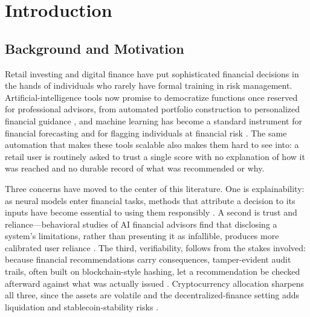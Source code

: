 \section{Introduction}\label{sec:intro}

\subsection{Background and Motivation}\label{subsec:background}
Retail investing and digital finance have put sophisticated financial decisions in
the hands of individuals who rarely have formal training in risk management.
Artificial-intelligence tools now promise to democratize functions once reserved for
professional advisors, from automated portfolio construction to personalized
financial guidance \cite{ref1,ref2,ref8}, and machine learning has become a standard
instrument for financial forecasting and for flagging individuals at financial risk
\cite{ref3,ref7,ref18}. The same automation that makes these tools scalable also
makes them hard to see into: a retail user is routinely asked to trust a single score
with no explanation of how it was reached and no durable record of what was
recommended or why.

Three concerns have moved to the center of this literature. One is explainability: as
neural models enter financial tasks, methods that attribute a decision to its inputs
have become essential to using them responsibly \cite{ref10,ref12,ref21}. A second is
trust and reliance---behavioral studies of AI financial advisors find that disclosing
a system's limitations, rather than presenting it as infallible, produces more
calibrated user reliance \cite{ref11}. The third, verifiability, follows from the
stakes involved: because financial recommendations carry consequences, tamper-evident
audit trails, often built on blockchain-style hashing, let a recommendation be checked
afterward against what was actually issued \cite{ref13,ref16,ref22}. Cryptocurrency
allocation sharpens all three, since the assets are volatile and the
decentralized-finance setting adds liquidation and stablecoin-stability risks
\cite{ref5,ref6}.

